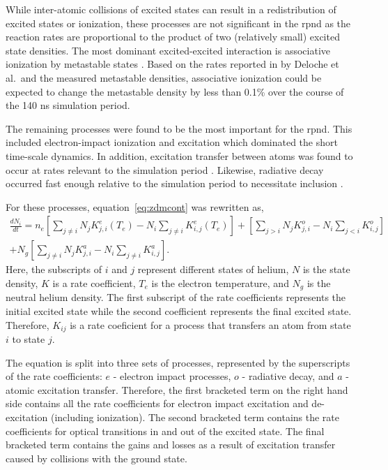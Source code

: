 While inter-atomic collisions of excited states can result in a redistribution
of excited states or ionization, these processes are not significant in the
\acs{rpnd} as the reaction rates are proportional to the product of two
(relatively small) excited state densities. The most dominant excited-excited
interaction is associative ionization by metastable states \cite{Deloche1976}.
Based on the rates reported in by Deloche et al.\ and the measured metastable
densities, associative ionization could be expected to change the metastable
density by less than 0.1\% over the course of the 140 ns simulation period.

The remaining processes were found to be the most important for the \acs{rpnd}.
This included electron-impact ionization and excitation which dominated the
short time-scale dynamics. In addition, excitation transfer between atoms was
found to occur at rates relevant to the simulation period \cite{Lieberman2005}.
Likewise, radiative decay occurred fast enough relative to the simulation period
to necessitate inclusion \cite{Kramida2012}.

For these processes, equation~\ref{eq:zdmcont} was rewritten as,
\begin{multline}
  \frac{dN_i}{dt} =   n_e \left[       \sum_{j\neq i} N_j K^e_{j,i}(T_e) 
                                 - N_i \sum_{j\neq i}     K^e_{i,j}(T_e) \right]
                        + \left[       \sum_{j > i}   N_j K^o_{j,i} 
                                 - N_i \sum_{j < i}       K^o_{i,j}      \right] \\
                    + N_g \left[       \sum_{j\neq i} N_j K^a_{j,i} 
                                 - N_i \sum_{j\neq i}     K^a_{i,j}      \right].
  \label{eq:gcont}
\end{multline}
Here, the subscripts of $i$ and $j$ represent different states of helium, $N$ is
the state density, $K$ is a rate coefficient, $T_e$ is the electron temperature,
and $N_g$ is the neutral helium density. The first subscript of the rate
coefficients represents the initial excited state while the second coefficient
represents the final excited state. Therefore, $K_{ij}$ is a rate coeficient for
a process that transfers an atom from state $i$ to state $j$.

The equation is split into three sets of processes, represented by the
superscripts of the rate coefficients: $e$ - electron impact processes, $o$ -
radiative decay, and $a$ - atomic excitation transfer. Therefore, the first
bracketed term on the right hand side contains all the rate coefficients for
electron impact excitation and de-excitation (including ionization). The second
bracketed term contains the rate coefficients for optical transitions in and out
of the excited state. The final bracketed term contains the gains and losses as
a result of excitation transfer caused by collisions with the ground state.

